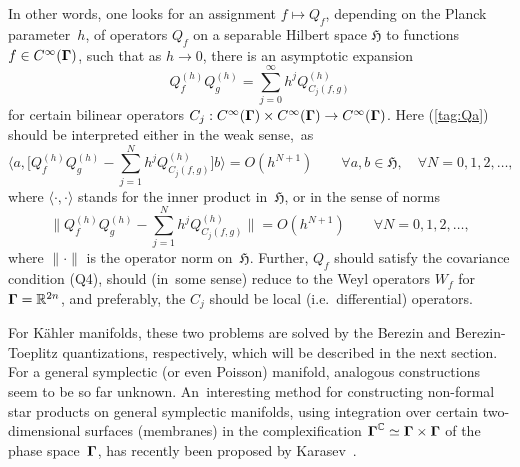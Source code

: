\documentclass[11pt]{amsart}
\numberwithin{equation}{section}
\theoremstyle{remark}
\newcommand\spr[2]{\langle #1,#2\rangle}
\newcommand\h{^{(h)}}
\newcommand\Omg{{\bigam}}   %
\newcommand\HH{\mathfrak H}
\newcommand\RR{\mathbb R}
\newcommand{\CC}{\C}
\newcommand{\bigam}{\mbox{\boldmath $\Gamma$}}
\newcommand{\C}{\mathbb C}
\begin{document}
In other words, one looks for an assignment $f\mapsto Q_f$, depending on the
Planck parameter~$h$, of operators $Q_f$ on a separable Hilbert space $\HH$ to
functions $f\in C^\infty(\Omg)$, such that as $h\to0$, there is an asymptotic
expansion
\begin{equation}  Q\h_f Q\h_g = \sum_{j=0}^\infty h^j Q\h_{C_j(f,g)}
\label{tag:Qa}  \end{equation}
for certain bilinear operators $C_j:C^\infty(\Omg)\times C^\infty(\Omg)\to
C^\infty(\Omg)$. Here (\ref{tag:Qa}) should be interpreted either in the weak
sense,~as
$$ \Big\langle a,\Big[ Q\h_f Q\h_g - \sum_{j=1}^N h^j Q\h_{C_j(f,g)} \Big]b
\Big\rangle = O(h^{N+1}) \qquad\forall a,b\in\HH,\quad\forall N=0,1,2,\dots, $$
where $\spr\cdot\cdot$ stands for the inner product in~$\HH$, or in the sense
of norms
$$ \Big\| Q\h_f Q\h_g - \sum_{j=1}^N h^j Q\h_{C_j(f,g)} \Big\| = O(h^{N+1})
\qquad \forall N=0,1,2,\dots,  $$
where $\|\cdot\|$ is the operator norm on~$\HH$. Further, $Q_f$ should satisfy
the covariance condition (Q4), should (in~some sense) reduce to the Weyl
operators $W_f$ for $\Omg=\RR^{2n}$, and preferably, the $C_j$ should be
local (i.e.~differential) operators.

For K\"ahler manifolds, these two problems are solved by the Berezin and
Berezin-Toeplitz quantizations, respectively, which will be described
in the next section. For a general symplectic (or even Poisson) manifold,
analogous constructions seem to be so far unknown. An~interesting method for
constructing non-formal star products on general symplectic manifolds,
using integration over certain two-dimensional surfaces (membranes) in the
complexification $\Omg^\CC \simeq \Omg\times \Omg$ of the phase space~$\Omg$,
has recently been proposed by Karasev~\cite{bib:Karas}.
\end{document}

